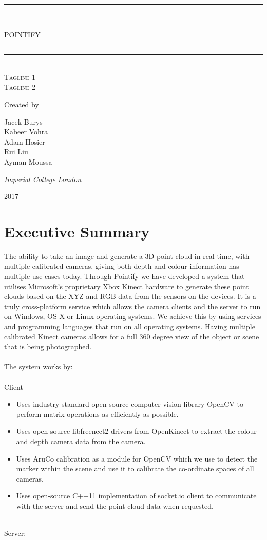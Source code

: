 \documentclass{article}
\newcommand*{\titleGP}{\begingroup %
\centering %
\vspace*{\baselineskip} %

\rule{\textwidth}{1.6pt}\vspace*{-\baselineskip}\vspace*{2pt} %
\rule{\textwidth}{0.4pt}\\[\baselineskip] %

{\LARGE POINTIFY}\\[0.2\baselineskip] %

\rule{\textwidth}{0.4pt}\vspace*{-\baselineskip}\vspace{3.2pt} %
\rule{\textwidth}{1.6pt}\\[\baselineskip] %

\scshape %
Tagline 1 \\ 
Tagline 2\par

\vspace*{2\baselineskip}

Created by \\[\baselineskip]
{\Large Jacek Burys \\ Kabeer Vohra \\ Adam Hosier \\ Rui Liu \\ Ayman Moussa \par} %

\vspace*{1\baselineskip}
{\itshape Imperial College London\par} %

\vfill 

{\scshape 2017} \\[0.3\baselineskip] %

\endgroup}
\begin{document}
 

\titleGP
\thispagestyle{empty}

\newpage
\setcounter{page}{1}
\tableofcontents

\newpage
\section{Executive Summary}

The ability to take an image and generate a 3D point cloud in real time, with multiple calibrated cameras, giving both depth and colour information has multiple use cases today. Through Pointify we have developed a system that utilises Microsoft’s proprietary Xbox Kinect hardware to generate these point clouds based on the XYZ and RGB data from the sensors on the devices. It is a truly cross-platform service which allows the camera clients and the server to run on Windows, OS X or Linux operating systems. We achieve this by using services and programming languages that run on all operating systems. Having multiple calibrated Kinect cameras allows for a full 360 degree view of the object or scene that is being photographed.
\\\\
The system works by:
\\\\
Client
\begin{itemize}
\item Uses industry standard open source computer vision library OpenCV to perform matrix operations as efficiently as possible.
\item Uses open source libfreenect2 drivers from OpenKinect to extract the colour and depth camera data from the camera.
\item Uses AruCo calibration as a module for OpenCV which we use to detect the marker within the scene and use it to calibrate the co-ordinate spaces of all cameras.
\item Uses open-source C++11 implementation of socket.io client to communicate with the server and send the point cloud data when requested.
\end{itemize}
~\\
Server:
\end{document}
